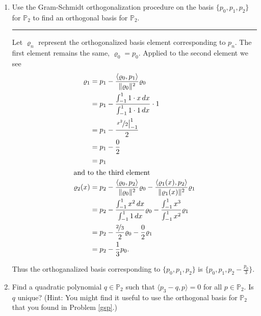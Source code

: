 \documentclass[12pt]{amsart}
\newcommand{\1}{\mathbbm{1}}
\numberwithin{equation}{section}
\numberwithin{Theorem}{section}
\theoremstyle{plain} %
\theoremstyle{definition}
\theoremstyle{remark}
\begin{document}
\begin{enumerate}[1.]
\begin{enumerate}[(a)]
\end{enumerate}



\clearpage

\item\label{gsp} Use the Gram-Schmidt orthogonalization procedure on the basis \(\{p_{0},p_{1},p_{2}\}\) for \(\mathbb{P}_{2}\) to find an orthogonal basis for \(\mathbb{P}_{2}\).\bigskip

\hrule
\bigskip

Let \(\varrho_n\) represent the orthogonalized basis element corresponding to \(p_n\).
The first element remains the same, \(\varrho_0=p_0\). 
Applied to the second element we see
\begin{align*}
	\varrho_1
	&=p_1-\frac{\langle\varrho_0,p_1\rangle}{\|\varrho_0\|^2}\varrho_0 \\
	&=p_1-\frac{\int_{-1}^{1}1\cdot x\,dx}{\int_{-1}^{1}1\cdot1\,dx}\cdot1 \\
	&=p_1-\frac{\left.\nicefrac{x^2}{2}\right|_{-1}^1}{2} \\
	&=p_1-\frac{0}{2} \\
	&=p_1 \\
\intertext{and to the third element}
	\varrho_2(x)
	&=p_2-\frac{\langle\varrho_0,p_2\rangle}{\|\varrho_0\|^2}\varrho_0 -\frac{\langle\varrho_1(x),p_2\rangle}{\|\varrho_1(x)\|^2}\varrho_1 \\
	&=p_2-\frac{\int_{-1}^{1}x^2\,dx}{\int_{-1}^{1}1\,dx}\varrho_0 -\frac{\int_{-1}^{1}x^3}{\int_{-1}^{1}x^2}\varrho_1 \\
	&=p_2-\frac{\nicefrac{2}{3}}{2}\varrho_0 -\frac{0}{2}\varrho_1 \\
	&=p_2-\frac{1}{3}p_0. \\
\end{align*}

Thus the orthoganalized basis corresponding to \(\{p_0,p_1,p_2\}\) is \(\{p_0,p_1,p_2-\frac{p_0}{3}\}\).

\clearpage

\item Find a quadratic polynomial \(q\in\mathbb{P}_{2}\) such that \(\langle p_{3}-q,p\rangle = 0\) for all \(p\in\mathbb{P}_{2}\). Is \(q\) unique? (Hint: You might find it useful to use the orthogonal basis for \(\mathbb{P}_{2}\) that you found in Problem \ref{gsp}.) \bigskip


\end{enumerate}
\end{document}
